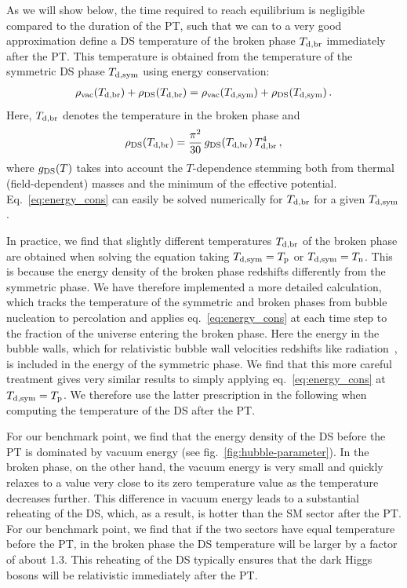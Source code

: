 As we will show below, the time required to  reach equilibrium is negligible compared to the duration of the \ac{PT}, such that we can to a very good approximation define a \ac{DS} temperature of the broken phase $T_{\text{d},\text{br}}$ immediately after the \ac{PT}. This temperature is obtained from the temperature of the symmetric \ac{DS} phase $T_{\text{d},\text{sym}}$ using energy conservation:
\begin{align}
	\rho_\text{vac}(T_{\text{d},\text{br}}) + \rho_{\text{DS}}(T_{\text{d},\text{br}}) =  \rho_\text{vac}(T_{\text{d},\text{sym}}) + \rho_{\text{DS}}(T_{\text{d},\text{sym}}) \, . \label{eq:energy_cons}
\end{align}
Here, $T_{\text{d},\text{br}}$ denotes the temperature in the broken phase and
\begin{align}
	\rho_{\text{DS}}(T_{\text{d},\text{br}}) = \frac{\pi^2}{30} \, g_{\text{DS}}(T_{\text{d},\text{br}}) \, T_{\text{d},\text{br}}^4 \,  ,
\end{align}
where $g_{\text{DS}}(T)$ takes into account the $T$-dependence stemming both from thermal (field-dependent) masses and the minimum of the effective potential. Eq.~\eqref{eq:energy_cons} can easily be solved numerically for $T_{\text{d},\text{br}}$ for a given $T_{\text{d},\text{sym}}$.

In practice, we find that slightly different temperatures $T_{\text{d},\text{br}}$ of the broken phase are obtained when solving the equation taking $T_{\text{d},\text{sym}}= T_{\text{p}}$ or $T_{\text{d},\text{sym}} = T_{\text{n}}$. This is because the energy density of the broken phase redshifts differently from the symmetric phase. We have therefore implemented a more detailed  calculation, which tracks the temperature of the symmetric and broken phases from bubble nucleation to percolation and applies eq.~\eqref{eq:energy_cons} at each time step to the fraction of the universe entering the broken phase. Here the energy in the bubble walls, which for relativistic bubble wall velocities redshifts like radiation~\cite{Gouttenoire:2023naa}, is included in the energy of the symmetric phase. We find that this more careful treatment gives very similar results to simply applying eq.~\eqref{eq:energy_cons} at $T_{\text{d},\text{sym}} = T_{\text{p}}$. We therefore use the latter prescription in the following when computing the temperature of the \ac{DS} after the \ac{PT}.

For our benchmark point, we find that the energy density of the \ac{DS} before the \ac{PT} is dominated by vacuum energy (see fig.~\ref{fig:hubble-parameter}). In the broken phase, on the other hand, the vacuum energy is very small and quickly relaxes to a value very close to its zero temperature value as the temperature decreases further. This difference in vacuum energy leads to a substantial reheating of the \ac{DS}, which, as a result, is  hotter than the \ac{SM} sector after the \ac{PT}. For our benchmark point, we find that if the two sectors have equal temperature before the \ac{PT}, in the broken phase the \ac{DS} temperature will be larger by a factor of about 1.3. This reheating of the \ac{DS} typically ensures that the dark Higgs bosons will be relativistic immediately after the \ac{PT}.

